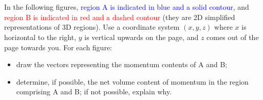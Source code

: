 \documentclass[a4paper,12pt,%
onecolumn,oneside,%
british%
]{memoir}
\renewcommand*{\|}[1][]{\nonscript\:#1\vert\nonscript\:\mathopen{}}
\begin{document}
\section{}
\label{sec:Pcontents}

In the following figures, \textcolor{blue}{region A is indicated in blue and a solid contour}, and \textcolor{red}{region B is indicated in red and a dashed contour} (they are 2D simplified representations of 3D regions). Use a coordinate system $(x,y,z)$ where $x$ is horizontal to the right, $y$ is vertical upwards on the page, and $z$ comes out of the page towards you. For each figure:
\begin{itemize}[nosep]
\item draw the vectors representing the momentum contents of A and B;
\item determine, if possible, the net volume content of momentum in the region comprising A and B; if not possible, explain why.
\end{itemize}
\end{document}

